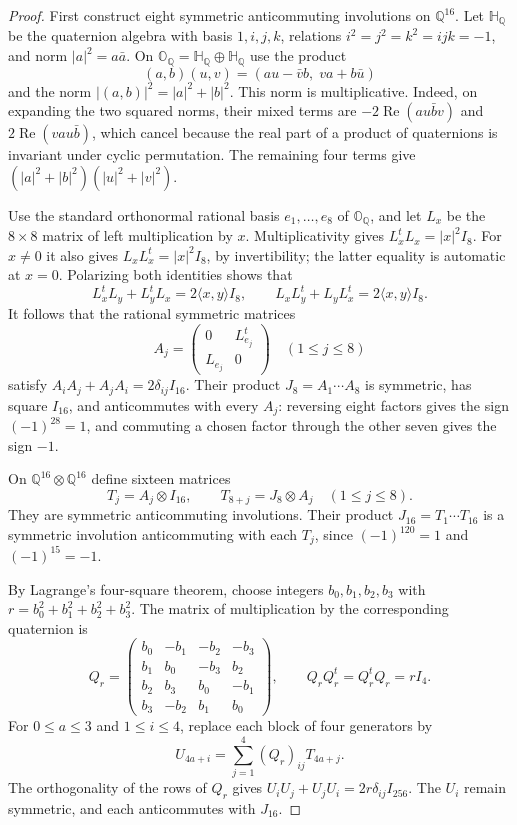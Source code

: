 \documentclass[11pt]{article}
\numberwithin{equation}{section}
\theoremstyle{definition}
\theoremstyle{remark}
\begin{document}
\begin{proof}
First construct eight symmetric anticommuting involutions on $\mathbb Q^{16}$.
Let $\mathbb H_{\mathbb Q}$ be the quaternion algebra with basis $1,i,j,k$,
relations $i^2=j^2=k^2=ijk=-1$, and norm
$|a|^2=a\bar a$.  On
$\mathbb O_{\mathbb Q}=\mathbb H_{\mathbb Q}\oplus\mathbb H_{\mathbb Q}$ use the product
\[
 (a,b)(u,v)=(au-\bar v b,\;va+b\bar u)
\]
and the norm $|(a,b)|^2=|a|^2+|b|^2$.
This norm is multiplicative.  Indeed, on expanding the two squared
norms, their mixed terms are
$-2\operatorname{Re}(au\bar b v)$ and
$2\operatorname{Re}(vau\bar b)$, which cancel because the real part of
a product of quaternions is invariant under cyclic permutation.
The remaining four terms give
$(|a|^2+|b|^2)(|u|^2+|v|^2)$.

Use the standard orthonormal rational basis $e_1,\ldots,e_8$ of
$\mathbb O_{\mathbb Q}$, and let $L_x$ be the $8\times8$ matrix of left
multiplication by $x$.  Multiplicativity gives
$L_x^tL_x=|x|^2I_8$.  For $x\ne0$ it also gives
$L_xL_x^t=|x|^2I_8$, by invertibility; the latter equality is automatic
at $x=0$.  Polarizing both identities shows that
\[
 L_x^tL_y+L_y^tL_x=2\langle x,y\rangle I_8,
 \qquad
 L_xL_y^t+L_yL_x^t=2\langle x,y\rangle I_8.
\]
It follows that the rational symmetric matrices
\[
 A_j=\begin{pmatrix}0&L_{e_j}^t\\L_{e_j}&0\end{pmatrix}
 \quad(1\le j\le8)
\]
satisfy $A_iA_j+A_jA_i=2\delta_{ij}I_{16}$.
Their product $J_8=A_1\cdots A_8$ is symmetric, has square $I_{16}$,
and anticommutes with every $A_j$: reversing eight factors gives the
sign $(-1)^{28}=1$, and commuting a chosen factor through the other
seven gives the sign $-1$.

On $\mathbb Q^{16}\otimes\mathbb Q^{16}$ define sixteen matrices
\[
 T_j=A_j\otimes I_{16},\qquad
 T_{8+j}=J_8\otimes A_j\quad(1\le j\le8).
\]
They are symmetric anticommuting involutions.  Their product
$J_{16}=T_1\cdots T_{16}$ is a symmetric involution anticommuting with
each $T_j$, since $(-1)^{120}=1$ and $(-1)^{15}=-1$.

By Lagrange's four-square theorem, choose integers
$b_0,b_1,b_2,b_3$ with $r=b_0^2+b_1^2+b_2^2+b_3^2$.
The matrix of multiplication by the corresponding quaternion is
\[
 Q_r=\begin{pmatrix}
 b_0&-b_1&-b_2&-b_3\\
 b_1&b_0&-b_3&b_2\\
 b_2&b_3&b_0&-b_1\\
 b_3&-b_2&b_1&b_0
 \end{pmatrix},\qquad
 Q_rQ_r^t=Q_r^tQ_r=rI_4.
\]
For $0\le a\le3$ and $1\le i\le4$, replace each block of four
generators by
\[
 U_{4a+i}=\sum_{j=1}^4(Q_r)_{ij}T_{4a+j}.
\]
The orthogonality of the rows of $Q_r$ gives
$U_iU_j+U_jU_i=2r\delta_{ij}I_{256}$.  The $U_i$ remain symmetric,
and each anticommutes with $J_{16}$.


\end{proof}
\end{document}

